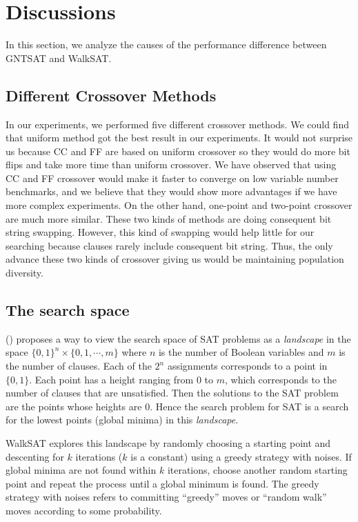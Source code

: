 \section{Discussions}
In this section, we analyze the causes of the performance difference between
GNTSAT and WalkSAT.

\subsection{Different Crossover Methods}
In our experiments, we performed five different crossover methods. We could
find that uniform method got the best result in our experiments. It would not
surprise us because CC and FF are based on uniform crossover so they would do
more bit flips and take more time than uniform crossover. We have observed
that using CC and FF crossover would make it faster to converge on low
variable number benchmarks, and we believe that they would show more
advantages if we have more complex experiments. On the other hand, one-point
and two-point crossover are much more similar. These two kinds of methods are
doing consequent bit string swapping. However, this kind of swapping would
help little for our searching because clauses rarely include consequent bit
string. Thus, the only advance these two kinds of crossover giving us would be
maintaining population diversity.

\subsection{The search space}
\citeauthor{biere2009handbook} (\citeyear{biere2009handbook}) proposes a way to view the search space of
SAT problems as a \textit{landscape} in the space $\{0, 1\}^n \times \{0,1,\cdots,m\}$
where $n$ is the number of Boolean variables and
$m$ is the number of clauses. Each of the
$2^n$ assignments corresponds to a point in
$\{0,1\}$. Each point has a height ranging from
$0$ to $m$, which corresponds to the
number of clauses that are unsatisfied. Then the solutions to the SAT problem
are the points whose heights are $0$. Hence the search
problem for SAT is a search for the lowest points (global minima) in this
\textit{landscape}.

WalkSAT explores this landscape by randomly choosing a starting point and
descenting for $k$ iterations ($k$ is a
constant) using a greedy strategy with noises. If global minima are not found
within $k$ iterations, choose another random starting point
and repeat the process until a global minimum is found. The greedy strategy
with noises refers to committing ``greedy'' moves or ``random walk'' moves
according to some probability.

